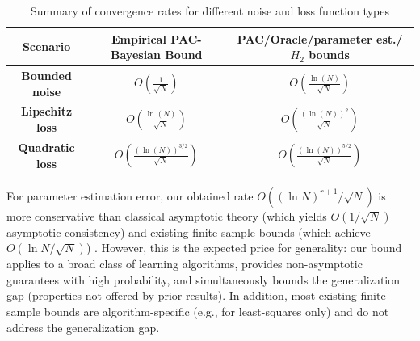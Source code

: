 \documentclass{article}
\newcommand{\w}{\mathbf{w}}
\begin{document}


  
\begin{table}[ht]
\centering
\caption{Summary of convergence rates for different noise and loss function types \label{rates}}
\begin{tabular}{|c|c|c|}
\hline
\textbf{Scenario} & \textbf{Empirical PAC-Bayesian Bound} & \textbf{PAC/Oracle/parameter est./$H_2$ bounds} \\
\hline
\textbf{Bounded noise} & $O\left(\frac{1}{\sqrt{N}}\right)$ & $O\left(\frac{\ln(N)}{\sqrt{N}}\right)$ \\
\hline
\textbf{Lipschitz loss} & $O\left(\frac{\ln(N)}{\sqrt{N}}\right)$ & $O\left(\frac{(\ln(N))^2}{\sqrt{N}}\right)$
 \\
\hline
\textbf{Quadratic loss} & $O\left(\frac{(\ln(N))^{3/2}}{\sqrt{N}}\right)$ & $O\left(\frac{(\ln(N))^{5/2}}{\sqrt{N}}\right)$ 
\\
\hline
\end{tabular}
\end{table}

For parameter estimation error, our obtained rate $O((\ln N)^{r+1}/\sqrt{N})$ is more conservative than classical asymptotic theory \cite{LjungBook,CainesBook} (which yields  $O(1/\sqrt{N})$ asymptotic consistency) and existing finite-sample bounds \cite{oymak2021revisiting,lale2020logarithmic,Simchowitz_Foster_2020,Ziemann1}(which achieve $O(\ln N/\sqrt{N})$) . However, this is the expected price for generality: our bound applies to a broad class of learning algorithms, provides non-asymptotic guarantees with high probability, and simultaneously bounds the generalization gap (properties not offered by prior results). In addition, most existing finite-sample bounds are algorithm-specific (e.g., for least-squares only) and do not address the generalization gap.
\end{document}
